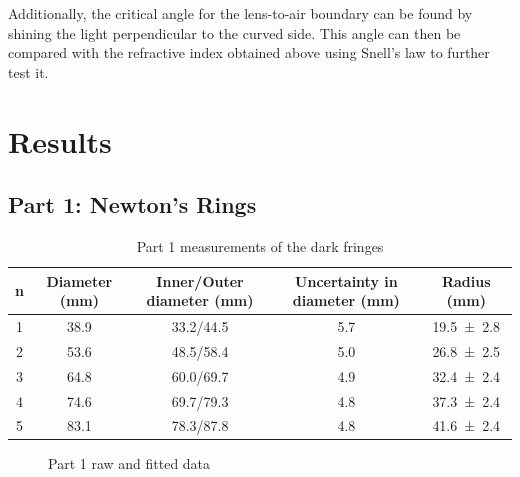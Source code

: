 \documentclass[a4paper]{scrartcl}
\begin{document}
Additionally, the critical angle for the lens-to-air boundary can be found by shining the light perpendicular to the curved side. This angle can then be compared with the refractive index obtained above using Snell's law to further test it.

\section{Results}
\subsection{Part 1: Newton's Rings}
\begin{table}
    \centering
    \begin{tabular}{c | c | c | c | c}
        n & Diameter (\si{\milli\metre}) & Inner/Outer diameter (\si{\milli\metre}) & Uncertainty in diameter (\si{\milli\metre}) & Radius (\si{\milli\metre}) \\
        \hline
        1 & 38.9 & 33.2/44.5 & 5.7 & \SI{19.5 \pm 2.8}{} \\
        2 & 53.6 & 48.5/58.4 & 5.0 & \SI{26.8 \pm 2.5}{} \\
        3 & 64.8 & 60.0/69.7 & 4.9 & \SI{32.4 \pm 2.4}{} \\
        4 & 74.6 & 69.7/79.3 & 4.8 & \SI{37.3 \pm 2.4}{} \\
        5 & 83.1 & 78.3/87.8 & 4.8 & \SI{41.6 \pm 2.4}{} \\
        \hline
    \end{tabular}
    \caption{Part 1 measurements of the dark fringes}
    \label{tab:part1_data}
\end{table}

\begin{figure}
    \centering
    \caption{Part 1 raw and fitted data}
    \label{fig:part1_graph}
\end{figure}
\end{document}
